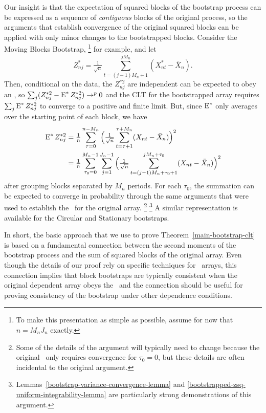 \documentclass[11pt]{article}
\begin{document}
Our insight is that the expectation of squared blocks of the bootstrap
process can be expressed as a sequence of \emph{contiguous} blocks of
the original process, so the arguments that establish convergence of
the original squared blocks can be applied with only minor changes to
the bootstrapped blocks. Consider the Moving Blocks Bootstrap,%
\footnote{To make this presentation as simple as possible, assume for
  now that $n = M_n J_n$ exactly.} %
for example, and let
\begin{equation*}
  Z_{nj}^* = \tfrac{1}{\sqrt{n}} \sum_{t=(j-1) M_n + 1}^{j M_n} (X_{nt}^* - \bar X_n).
\end{equation*}
Then, conditional on the data, the $Z_{nj}^{*2}$ are independent can
be expected to obey an \lln, so %
$\sum_j (Z_{nj}^{*2} - \operatorname{E}^* Z_{nj}^{*2}) \to^p 0$ %
and the CLT for the bootstrapped array requires $\sum_j \operatorname{E}^*
Z_{nj}^{*2}$ to converge to a positive and finite limit.  But, since
$\operatorname{E}^*$ only averages over the starting point of each block, we have
\begin{align*}
  \operatorname{E}^* Z_{nj}^{*2} &=
  \tfrac{1}{n} \sum_{\tau = 0}^{n-M_n}
  \Big(\tfrac{1}{\sqrt{n}}
  \sum_{t= \tau + 1}^{\tau + M_n} (X_{nt} - \bar X_n) \Big)^2 \\
  &= \tfrac{1}{n} \sum_{\tau_0 = 0}^{M_n-1}
  \sum_{j=1}^{J_n-1}
  \Big(\tfrac{1}{\sqrt{n}}
  \sum_{t= (j - 1) M_n + \tau_0 + 1}^{j M_n + \tau_0} (X_{nt} - \bar X_n) \Big)^2
\end{align*}
after grouping blocks separated by $M_n$ periods. For each $\tau_0$,
the summation can be expected to converge in probability through the
same arguments that were used to establish the \clt\ for the original
array.%
\footnote{Some of the details of the argument will typically need to
  change because the original \clt\ only requires convergence for
  $\tau_0 = 0$, but these details are often incidental to the original
  argument.}%
\footnote{Lemmas~\ref{bootstrap-variance-convergence-lemma} and
  \ref{bootstrapped-zsq-uniform-integrability-lemma} are particularly
  strong demonstrations of this argument.} %
A similar representation is available for the Circular and Stationary
bootstraps.

In short, the basic approach that we use to prove Theorem~\ref{main-bootstrap-clt}
is based on a fundamental connection between the second moments of the
bootstrap process and the sum of squared blocks of the original
array. Even though the details of our proof rely on specific
techniques for \ned\ arrays, this connection implies that block
bootstraps are typically consistent when the original dependent array
obeys the \clt\ and the connection should be useful for proving
consistency of the bootstrap under other dependence conditions.
\end{document}
